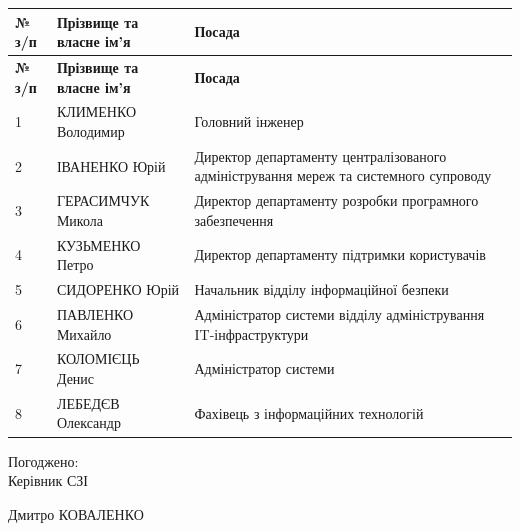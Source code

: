 \documentclass[12pt]{article}
\begin{document}
\noindent
\begin{longtable}{|C{1.5cm}|L{6cm}|L{7.5cm}|}
  \hline
  \textbf{№ з/п} & \textbf{Прізвище та власне ім'я} & \textbf{Посада} \\
  \hline
  \endfirsthead
  \hline
  \textbf{№ з/п} & \textbf{Прізвище та власне ім'я} & \textbf{Посада} \\
  \hline
  \endhead
  \hline
  \endfoot
  \hline
  \endlastfoot
  
    1 & КЛИМЕНКО Володимир & Головний інженер \\ \hline
  
    2 & ІВАНЕНКО Юрій & Директор департаменту централізованого адміністрування мереж та системного супроводу \\ \hline
  
    3 & ГЕРАСИМЧУК Микола & Директор департаменту розробки програмного забезпечення \\ \hline
  
    4 & КУЗЬМЕНКО Петро & Директор департаменту підтримки користувачів \\ \hline
  
    5 & СИДОРЕНКО Юрій & Начальник відділу інформаційної безпеки \\ \hline
  
    6 & ПАВЛЕНКО Михайло & Адміністратор системи відділу адміністрування IT-інфраструктури \\ \hline
  
    7 & КОЛОМІЄЦЬ Денис & Адміністратор системи \\ \hline
  
    8 & ЛЕБЕДЄВ Олександр & Фахівець з інформаційних технологій \\ \hline
  
\end{longtable}

\vspace{1.5cm}

\noindent
\parbox[t]{0.5\textwidth}{Погоджено:\\Керівник СЗІ}%
\parbox[t]{0.5\textwidth}{\raggedleft{} Дмитро КОВАЛЕНКО}
\end{document}
